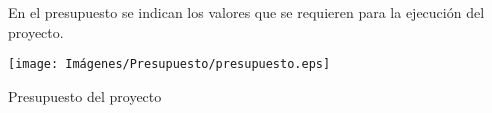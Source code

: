 En el presupuesto se indican los valores que se requieren para la ejecución del proyecto.

\begin{table}[h!]
    \begin{center}
    \centering
\texttt{[image: Imágenes/Presupuesto/presupuesto.eps]}
	\caption{Presupuesto del proyecto}
    \end{center}
\end{table}
